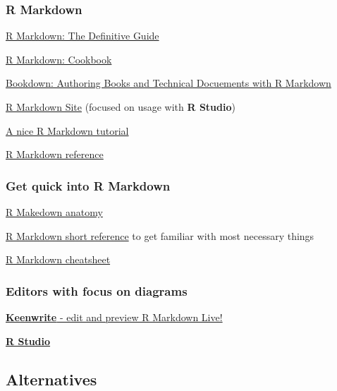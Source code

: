 \documentclass[
  12pt,
  a4paper,
  12pt,
  oneside,
  openany]{book}
\begin{document}
\hypertarget{links-rmarkdown}{%
\subsubsection*{R Markdown}\label{links-rmarkdown}}


\href{https://bookdown.org/yihui/rmarkdown/}{R Markdown: The Definitive Guide}

\href{https://bookdown.org/yihui/rmarkdown-cookbook/}{R Markdown: Cookbook}

\href{https://bookdown.org/yihui/bookdown/}{Bookdown: Authoring Books and Technical Docuements with R Markdown}

\href{https://rmarkdown.rstudio.com/lesson-1.html}{R Markdown Site} (focused on usage with \textbf{R Studio})

\href{https://rmd4sci.njtierney.com/}{A nice R Markdown tutorial}

\href{https://rmarkdown.rstudio.com/docs/reference/index.html}{R Markdown reference}

\hypertarget{links-rmarkdown-quick}{%
\subsubsection*{Get quick into R Markdown}\label{links-rmarkdown-quick}}


\href{https://intro2r.com/r-markdown-anatomy.html}{R Makedown anatomy}

\href{https://www.rstudio.com/wp-content/uploads/2015/03/rmarkdown-reference.pdf}{R Markdown short reference} to get familiar with most necessary things

\href{https://raw.githubusercontent.com/rstudio/cheatsheets/master/rmarkdown.pdf}{R Markdown cheatsheet}

\hypertarget{links-editors}{%
\subsubsection*{Editors with focus on diagrams}\label{links-editors}}


\href{https://github.com/DaveJarvis/keenwrite}{\textbf{Keenwrite} - edit and preview R Markdown Live!}

\href{https://www.rstudio.com/}{\textbf{R Studio}}

\hypertarget{links-alternatives}{%
\subsection*{Alternatives}\label{links-alternatives}}
\end{document}
